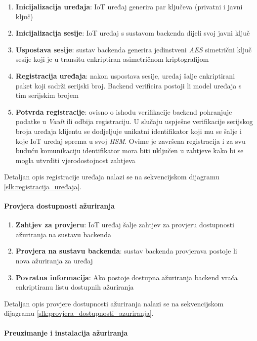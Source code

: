 \documentclass[zavrsnirad]{fer}
\begin{document}
	\begin{enumerate}
		\item \textbf{Inicijalizacija uređaja}: IoT uređaj generira par ključeva (privatni i javni ključ)
		\item \textbf{Inicijalizacija sesije}: IoT uređaj s sustavom backenda dijeli svoj javni ključ 
		\item \textbf{Uspostava sesije}: sustav backenda generira jedinstveni \textit{AES} simetrični ključ sesije koji je u transitu enkriptiran asimetričnom kriptografijom
		\item \textbf{Registracija uređaja}: nakon uspostava sesije, uređaj šalje enkriptirani paket koji sadrži serijski broj. Backend verificira postoji li model uređaja s tim serijskim brojem  
		\item \textbf{Potvrda registracije}: ovisno o ishodu verifikacije backend pohranjuje podatke u \textit{Vault} ili odbija registraciju. U slučaju uspješne verifikacije serijskog broja uređaja klijentu se dodjeljuje unikatni identifikator koji mu se šalje i koje IoT uređaj sprema u svoj \textit{HSM}. Ovime je završena registracija i za svu buduću komunikaciju identifikator mora biti uključen u zahtjeve kako bi se mogla utvrditi vjerodostojnost zahtjeva
	\end{enumerate}
	
	Detaljan opis registracije uređaja nalazi se na sekvencijskom dijagramu \ref{slk:registracija_uređaja}.
	
	
	\paragraph{Provjera dostupnosti ažuriranja}
	
	\begin{enumerate}
		\item \textbf{Zahtjev za provjeru}: IoT uređaj šalje zahtjev za provjeru dostupnosti ažuriranja na sustavu backenda
		\item \textbf{Provjera na sustavu backenda}: sustav backenda provjerava postoje li nova ažuriranja za uređaj
		\item \textbf{Povratna informacija}: Ako postoje dostupna ažuriranja backend vraća enkriptiranu listu dostupnih ažuriranja
	\end{enumerate}
	
	Detaljan opis provjere dostupnosti ažuriranja nalazi se na sekvencijskom dijagramu \ref{slk:provjera_dostupnosti_azuriranja}.
	
	
	\paragraph{Preuzimanje i instalacija ažuriranja}
	
\end{document}
